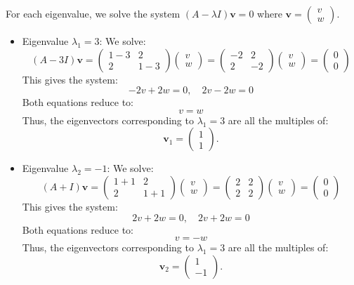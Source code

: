 \documentclass[addpoints, 12pt,answers]{exam}
\begin{document}
\begin{questions}
\begin{solution}
For each eigenvalue, we solve the system $(A - \lambda I)\mathbf{v} = 0$ where $\mathbf{v} = \begin{pmatrix} v \\ w \end{pmatrix}$.
\begin{itemize}
\item Eigenvalue $\lambda_1 = 3$:
We solve:
\[ (A - 3I) \mathbf{v} = \begin{pmatrix} 1 - 3 & 2 \\ 2 & 1 - 3 \end{pmatrix} \begin{pmatrix} v \\ w \end{pmatrix} = \begin{pmatrix} -2 & 2 \\ 2 & -2 \end{pmatrix} \begin{pmatrix} v \\ w \end{pmatrix} = \begin{pmatrix} 0 \\ 0 \end{pmatrix} \]
This gives the system:
\[ -2v + 2w = 0, \quad 2v - 2w = 0 \]
Both equations reduce to:
\[ v = w \]
Thus, the eigenvectors corresponding to $\lambda_1 = 3$ are all the multiples of:
\[ \mathbf{v}_1 = \begin{pmatrix} 1 \\ 1 \end{pmatrix}. \]

\item {Eigenvalue $\lambda_2 = -1$:}
We solve:
\[ (A + I) \mathbf{v} = \begin{pmatrix} 1 + 1 & 2 \\ 2 & 1 + 1 \end{pmatrix} \begin{pmatrix} v \\ w \end{pmatrix} = \begin{pmatrix} 2 & 2 \\ 2 & 2 \end{pmatrix} \begin{pmatrix} v \\ w \end{pmatrix} = \begin{pmatrix} 0 \\ 0 \end{pmatrix} \]
This gives the system:
\[ 2v + 2w = 0, \quad 2v + 2w = 0 \]
Both equations reduce to:
\[ v = -w \]
Thus, the eigenvectors corresponding to $\lambda_1 = 3$ are all the multiples of:
\[ \mathbf{v}_2 = \begin{pmatrix} 1 \\ -1 \end{pmatrix}. \]
\end{itemize}


\end{solution}
\end{questions}
\end{document}
